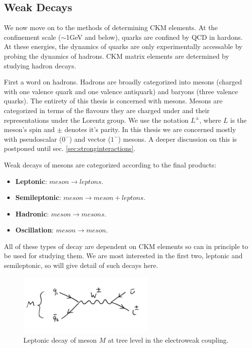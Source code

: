 \subsection{Weak Decays}
\label{sec:weakdecays}

We now move on to the methods of determining CKM elements. At the confinement scale ($\sim$1GeV and below), quarks are confined by QCD in hardons. At these energies, the dynamics of quarks are only experimentally accessable by probing the dynamics of hadrons. CKM matrix elements are determined by studying hadron decays.

First a word on hadrons. Hadrons are broadly categorized into mesons (charged with one valence quark and one valence antiquark) and baryons (three valence quarks). The entirety of this thesis is concerned with mesons. Mesons are categorized in terms of the flavours they are charged under and their representations under the Lorentz group. We use the notation $L^{\pm}$, where $L$ is the meson's spin and $\pm$ denotes it's parity. In this thesis we are concerned mostly with pseudoscalar ($0^-$) and vector ($1^-$) mesons. A deeper discussion on this is postponed until sec. \ref{sec:stronginteractions}.

Weak decays of mesons are categorized according to the final products:
\begin{itemize}
\item
  {\bf{Leptonic}}: $meson \to leptons$.
\item
  {\bf{Semileptonic}}: $meson \to meson + leptons$.
\item
  {\bf{Hadronic}}: $meson \to mesons$.
\item
  {\bf{Oscillation}}: $meson \to meson$.
\end{itemize}

All of these types of decay are dependent on CKM elements so can in principle to be used for studying them. We are most interested in the first two, leptonic and semileptonic, so will give detail of such decays here.

\begin{figure}
  \vspace{-10pt}
  \begin{center}
    \includegraphics[width=0.6\textwidth]{images/leptonicdecay.jpg}
  \end{center}
  \vspace{-20pt}
  \caption{Leptonic decay of meson $M$ at tree level in the electroweak coupling.}
  \label{fig:leptonicdecay}
\end{figure}

